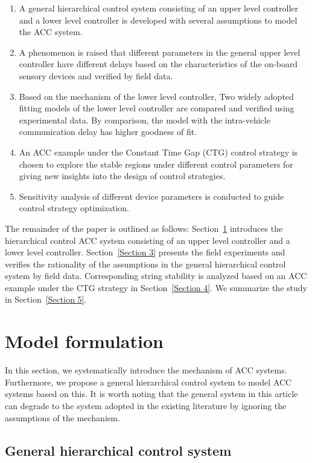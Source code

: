 \documentclass[journal]{IEEEtran}
\begin{document}
\begin{enumerate}
  \item A general hierarchical control system consisting of an upper level controller and a lower level controller is developed with several assumptions to model the ACC system.
  \item A phenomenon is raised that different parameters in the general upper level controller have different delays based on the characteristics of the on-board sensory devices and verified by field data.
  \item Based on the mechanism of the lower level controller, Two widely adopted fitting models of the lower level controller are compared and verified using experimental data. By comparison, the model with the intra-vehicle communication delay has higher goodness of fit.
  \item An ACC example under the Constant Time Gap (CTG) control strategy is chosen to explore the stable regions under different control parameters for giving new insights into the design of control strategies.
  \item Sensitivity analysis of different device parameters is conducted to guide control strategy optimization.
\end{enumerate}

The remainder of the paper is outlined as follows: Section~\ref{Section 2} introduces the hierarchical control ACC system consisting of an upper level controller and a lower level controller. Section~\ref{Section 3} presents the field experiments and verifies the rationality of the assumptions in the general hierarchical control system by field data. Corresponding string stability is analyzed based on an ACC example under the CTG strategy in Section~\ref{Section 4}. We summarize the study in Section~\ref{Section 5}.



\section{Model formulation}
\label{Section 2}
In this section, we systematically introduce the mechanism of ACC systems. Furthermore, we propose a general hierarchical control system to model ACC systems based on this. It is worth noting that the general system in this article can degrade to the system adopted in the existing literature by ignoring the assumptions of the mechanism.

\subsection{General hierarchical control system}
\label{Section 2.1}
\end{document}
